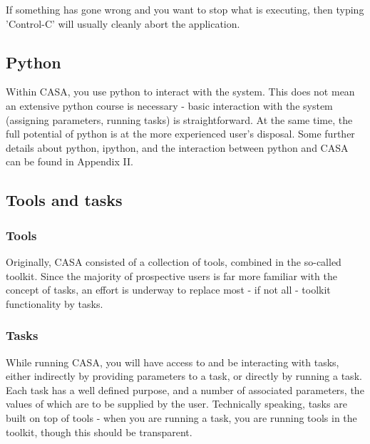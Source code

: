 If something has gone wrong and you want to stop what is executing,
then typing 'Control-C' will usually cleanly abort the application.

\subsection{Python}
\label{subsection:python}

Within CASA, you use python to interact with the system.  This does
not mean an extensive python course is necessary - basic interaction
with the system (assigning parameters, running tasks) is
straightforward.  At the same time, the full potential of python is at
the more experienced user's disposal.  Some further details about
python, ipython, and the interaction between python and CASA can be
found in Appendix II.

\subsection{Tools and tasks}
\label{subsection:tools.tasks}

\subsubsection{Tools}
\label{subsubsection:tools}

Originally, CASA consisted of a collection of tools, combined in the
so-called toolkit.  Since the majority of prospective users is far
more familiar with the concept of tasks, an effort is underway to
replace most - if not all - toolkit functionality by tasks.

\subsubsection{Tasks}
\label{subsubsection:tasks}

While running CASA, you will have access to and be interacting with
tasks, either indirectly by providing parameters to a task, or
directly by running a task.  Each task has a well defined purpose, and
a number of associated parameters, the values of which are to be
supplied by the user.  Technically speaking, tasks are built on top of
tools - when you are running a task, you are running tools in the
toolkit, though this should be transparent.

